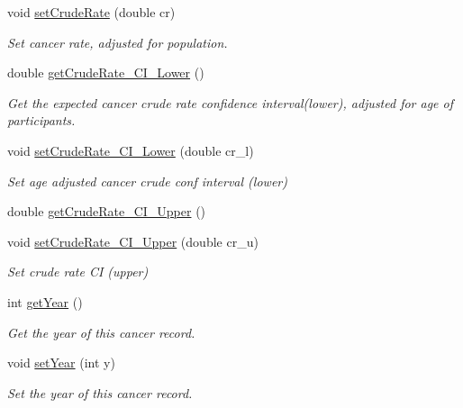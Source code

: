 \begin{DoxyCompactItemize}
void \hyperlink{classbridges_1_1data__src__dependent_1_1_cancer_incidence_a64a737fd7481262650efd596c508ffd6}{set\+Crude\+Rate} (double cr)
\begin{DoxyCompactList}\small\item\em Set cancer rate, adjusted for population. \end{DoxyCompactList}\item 
double \hyperlink{classbridges_1_1data__src__dependent_1_1_cancer_incidence_a8c410730b03abc78395e75b5024d495e}{get\+Crude\+Rate\+\_\+\+C\+I\+\_\+\+Lower} ()
\begin{DoxyCompactList}\small\item\em Get the expected cancer crude rate confidence interval(lower), adjusted for age of participants. \end{DoxyCompactList}\item 
void \hyperlink{classbridges_1_1data__src__dependent_1_1_cancer_incidence_a72e3960af58f32d26e32f49ada2f1555}{set\+Crude\+Rate\+\_\+\+C\+I\+\_\+\+Lower} (double cr\+\_\+l)
\begin{DoxyCompactList}\small\item\em Set age adjusted cancer crude conf interval (lower) \end{DoxyCompactList}\item 
double \hyperlink{classbridges_1_1data__src__dependent_1_1_cancer_incidence_a4ca1ceed275ab6371f861d3a03975f15}{get\+Crude\+Rate\+\_\+\+C\+I\+\_\+\+Upper} ()
\item 
void \hyperlink{classbridges_1_1data__src__dependent_1_1_cancer_incidence_a99e25dd53093badf350b06b7e0c8b725}{set\+Crude\+Rate\+\_\+\+C\+I\+\_\+\+Upper} (double cr\+\_\+u)
\begin{DoxyCompactList}\small\item\em Set crude rate CI (upper) \end{DoxyCompactList}\item 
int \hyperlink{classbridges_1_1data__src__dependent_1_1_cancer_incidence_aaff714019154afa796d54ed57ffc9492}{get\+Year} ()
\begin{DoxyCompactList}\small\item\em Get the year of this cancer record. \end{DoxyCompactList}\item 
void \hyperlink{classbridges_1_1data__src__dependent_1_1_cancer_incidence_aa5524736b76d67f1248d1a05d9f596a9}{set\+Year} (int y)
\begin{DoxyCompactList}\small\item\em Set the year of this cancer record. \end{DoxyCompactList}\item 

\end{DoxyCompactItemize}
